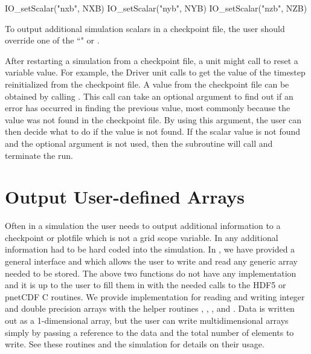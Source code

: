 \begin{codeseg}
 IO_setScalar("nxb", NXB)
 IO_setScalar("nyb", NYB)
 IO_setScalar("nzb", NZB)
\end{codeseg}

To output additional simulation scalars in a checkpoint file, the user should 
override one of the ``" or 
.

After restarting a simulation from a checkpoint file, a unit might
call  to reset a variable value.  For example,
the \unit{Driver} unit calls 
to get the value of the timestep  reinitialized from the
checkpoint file.  A value from the checkpoint file can be obtained by calling
.  This call can take an optional argument to find out if an
error has occurred in finding the previous value, most commonly because the value
was not found in the checkpoint file.  By using this argument, the user can then
decide what to do if the value is not found.  If the scalar value is not found 
and the optional argument is not used, then the subroutine will call  and terminate the run.



\section{Output User-defined Arrays}
\label{Sec: Output user defined arrays}

Often in a simulation the user needs to output additional information to a checkpoint or plotfile
which is not a grid scope variable.  In \flashx any additional information had to be hard coded
into the simulation.  In \flashx, we have provided a general interface 
and  which allows the user to write and read any generic array needed to
be stored.  The above two functions do not have any implementation and it is up to the user to
fill them in with the needed calls to the HDF5 or pnetCDF C routines.  We provide implementation
for reading and writing integer and double precision arrays with the helper routines
, , , and
.  Data is written
out as a 1-dimensional array, but the user can write multidimensional arrays simply by passing a
reference to the data and the total number of elements to write. See these
routines and the simulation  for details on their usage.


